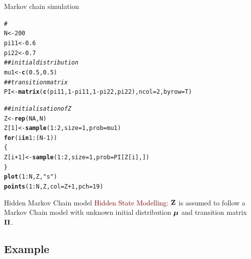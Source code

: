 \documentclass{beamer}\usepackage[]{graphicx}\usepackage[]{color}
\makeatletter
\newcommand{\hlnum}[1]{\textcolor[rgb]{0.686,0.059,0.569}{#1}}%
\newcommand{\hlstr}[1]{\textcolor[rgb]{0.192,0.494,0.8}{#1}}%
\newcommand{\hlcom}[1]{\textcolor[rgb]{0.678,0.584,0.686}{\textit{#1}}}%
\newcommand{\hlopt}[1]{\textcolor[rgb]{0,0,0}{#1}}%
\newcommand{\hlstd}[1]{\textcolor[rgb]{0.345,0.345,0.345}{#1}}%
\newcommand{\hlkwa}[1]{\textcolor[rgb]{0.161,0.373,0.58}{\textbf{#1}}}%
\newcommand{\hlkwb}[1]{\textcolor[rgb]{0.69,0.353,0.396}{#1}}%
\newcommand{\hlkwc}[1]{\textcolor[rgb]{0.333,0.667,0.333}{#1}}%
\newcommand{\hlkwd}[1]{\textcolor[rgb]{0.737,0.353,0.396}{\textbf{#1}}}%
\newenvironment{kframe}{%
 \def\at@end@of@kframe{}%
 \ifinner\ifhmode%
  \def\at@end@of@kframe{\end{minipage}}%
  \begin{minipage}{\columnwidth}%
 \fi\fi%
 \def\FrameCommand##1{\hskip\@totalleftmargin \hskip-\fboxsep
 \colorbox{shadecolor}{##1}\hskip-\fboxsep
     \hskip-\linewidth \hskip-\@totalleftmargin \hskip\columnwidth}%
 \MakeFramed {\advance\hsize-\width
   \@totalleftmargin\z@ \linewidth\hsize
   \@setminipage}}%
 {\par\unskip\endMakeFramed%
 \at@end@of@kframe}
\newenvironment{knitrout}{}{} %
\newcommand{\emphase}[1]{\textcolor{darkred}{#1}}
\newcommand{\paragraph}[1]{\emphase{#1}}
\newcommand{\Zbf}{{\bf Z}}
\newcommand{\Pibf}{\mbox{\mathversion{bold}{$\Pi$}}}
\newcommand{\mubf}{\mbox{\mathversion{bold}{$\mu$}}}
\makeatother
\begin{document}
\begin{frame}[fragile]{Markov chain simulation}

\begin{knitrout}\tiny
{}\color{fgcolor}\begin{kframe}
\begin{alltt}
\hlcom{#}
\hlstd{N} \hlkwb{<-} \hlnum{200}
\hlstd{pi11} \hlkwb{<-} \hlnum{0.6}
\hlstd{pi22} \hlkwb{<-} \hlnum{0.7}
\hlcom{## initial distribution}
\hlstd{mu1} \hlkwb{<-} \hlkwd{c}\hlstd{(}\hlnum{0.5}\hlstd{,} \hlnum{0.5}\hlstd{)}
\hlcom{##transition matrix}
\hlstd{PI} \hlkwb{<-} \hlkwd{matrix}\hlstd{(}\hlkwd{c}\hlstd{(pi11,} \hlnum{1}\hlopt{-}\hlstd{pi11,} \hlnum{1}\hlopt{-}\hlstd{pi22, pi22),} \hlkwc{ncol}\hlstd{=}\hlnum{2}\hlstd{,} \hlkwc{byrow} \hlstd{= T)}

\hlcom{##initialisation of Z}
\hlstd{Z} \hlkwb{<-} \hlkwd{rep}\hlstd{(}\hlnum{NA}\hlstd{, N)}
\hlstd{Z[}\hlnum{1}\hlstd{]} \hlkwb{<-} \hlkwd{sample}\hlstd{(}\hlnum{1}\hlopt{:}\hlnum{2}\hlstd{,} \hlkwc{size}\hlstd{=}\hlnum{1}\hlstd{,} \hlkwc{prob} \hlstd{= mu1)}
\hlkwa{for}\hlstd{( i} \hlkwa{in} \hlnum{1}\hlopt{:}\hlstd{(N}\hlopt{-}\hlnum{1}\hlstd{))}
\hlstd{\{}
  \hlstd{Z[i}\hlopt{+}\hlnum{1}\hlstd{]} \hlkwb{<-} \hlkwd{sample}\hlstd{(}\hlnum{1}\hlopt{:}\hlnum{2}\hlstd{,} \hlkwc{size}\hlstd{=}\hlnum{1}\hlstd{,} \hlkwc{prob} \hlstd{= PI[Z[i],])}
\hlstd{\}}
\hlkwd{plot}\hlstd{(}\hlnum{1}\hlopt{:}\hlstd{N, Z,} \hlstr{"s"}\hlstd{)}
\hlkwd{points}\hlstd{(}\hlnum{1}\hlopt{:}\hlstd{N, Z,} \hlkwc{col}\hlstd{=Z}\hlopt{+}\hlnum{1}\hlstd{,} \hlkwc{pch}\hlstd{=}\hlnum{19}\hlstd{)}
\end{alltt}
\end{kframe}
\end{knitrout}
\end{frame}

\begin{frame}[fragile]{Hidden Markov Chain model}
\paragraph{Hidden State Modelling:}
$\Zbf$ is assumed to follow a Markov Chain model with unknown initial distribution $\mubf$ and transition matrix  $\Pibf$.


\end{frame}

\subsection{Example}
\end{document}
